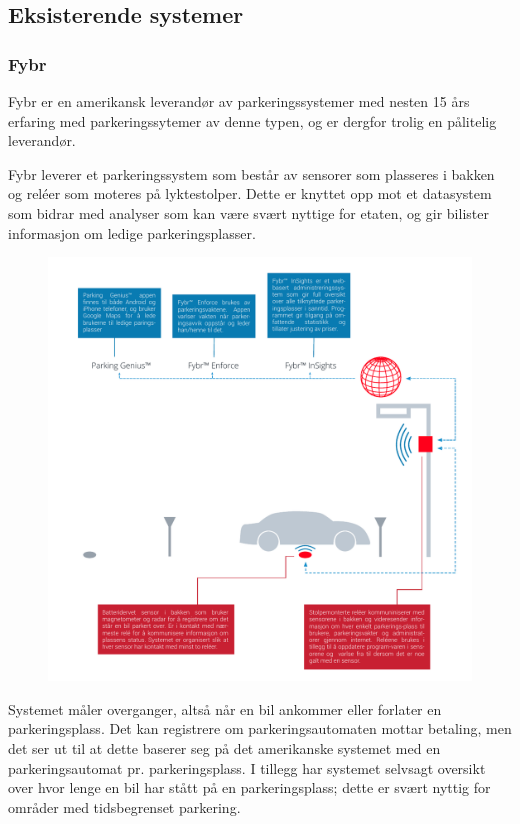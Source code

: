 \documentclass[a4paper, norsk, 12pt]{article}
\theoremstyle{remark}
\begin{document}
\subsection{Eksisterende systemer}
\label{sub:sksisterende_systemer}



\subsubsection{Fybr}
\label{ssub:fybr}
Fybr er en amerikansk leverandør av parkeringssystemer med nesten 15 års erfaring med parkeringssytemer av denne typen, og er dergfor trolig en pålitelig leverandør.

Fybr leverer et parkeringssystem som består av sensorer som plasseres i bakken og reléer som moteres på lyktestolper. Dette er knyttet opp mot et datasystem som bidrar med analyser som kan være svært nyttige for etaten, og gir bilister informasjon om ledige parkeringsplasser. 

\begin{figure}[H]
\centering
\centerline{\includegraphics[scale=1.0, clip=true, trim=1cm 0.5cm 0.5cm 0.5cm]{grafikk/fybr.pdf}}
\end{figure}

Systemet måler overganger, altså når en bil ankommer eller forlater en parkeringsplass. Det kan registrere om parkeringsautomaten mottar betaling, men det ser ut til at dette baserer seg på det amerikanske systemet med en parkeringsautomat pr. parkeringsplass. I tillegg har systemet selvsagt oversikt over hvor lenge en bil har stått på en parkeringsplass; dette er svært nyttig for områder med tidsbegrenset parkering.
\end{document}
